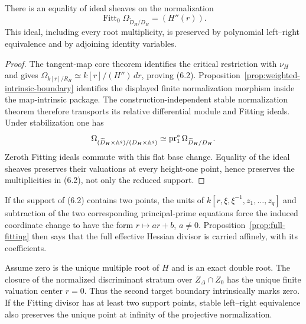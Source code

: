 \begin{proposition}
\label{prop:full-fitting}
There is an equality of ideal sheaves on the normalization
\[
 \operatorname{Fitt}_0\Omega_{\widetilde D_H/D_H}=(H''(r)). \tag{6.2}
\]
This ideal, including every root multiplicity, is preserved by polynomial
left--right equivalence and by adjoining identity variables.
\end{proposition}

\begin{proof}
The tangent-map core theorem identifies the critical restriction with
$\nu_H$ and gives
$\Omega_{k[r]/R_H}\simeq k[r]/(H'')\,dr$, proving (6.2).
Proposition~\ref{prop:weighted-intrinsic-boundary} identifies the displayed
finite normalization morphism inside the map-intrinsic package.  The
construction-independent stable normalization theorem therefore transports
its relative differential module and Fitting ideals.  Under
stabilization one has
\[
 \Omega_{(\widetilde D_H\times\mathbb A^q)/(D_H\times\mathbb A^q)}
 \simeq\operatorname{pr}_1^*\Omega_{\widetilde D_H/D_H}.
\]
Zeroth Fitting ideals commute with this flat base change.  Equality of the
ideal sheaves preserves their valuations at every height-one point, hence
preserves the multiplicities in (6.2), not only the reduced support.
\end{proof}

If the support of (6.2) contains two points, the units of
$k[r,\xi,\xi^{-1},z_1,\ldots,z_q]$ and subtraction of the two corresponding
principal-prime equations force the induced coordinate change to have the
form $r\mapsto ar+b$, $a\ne0$.  Proposition~\ref{prop:full-fitting} then says
that the full effective Hessian divisor is carried affinely, with its
coefficients.

\begin{lemma}
\label{lem:weighted-boundary-marks}
Assume zero is the unique multiple root of $H$ and is an exact double root.
The closure of the normalized discriminant stratum over
$Z_\Delta\cap Z_0$ has the unique finite valuation center $r=0$.  Thus the
second target boundary intrinsically marks zero.  If the Fitting divisor has
at least two support points, stable left--right equivalence also preserves
the unique point at infinity of the projective normalization.
\end{lemma}


